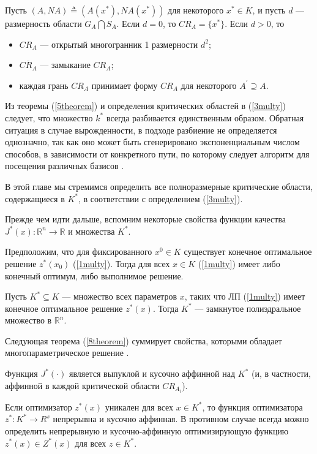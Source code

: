 \begin{theorem}\label{5theorem}
    Пусть $(A, NA) \triangleq (A (x^*), NA (x^*))$ для некоторого $x^* \in K$, и пусть $d$ --- размерность области $G_{A}\bigcap S_{A}$. Если $d = 0$, то $CR_{A} = \{x^*\}$. Если $d > 0$, то
    \begin{itemize}
        \item $CR_{A}$ --- открытый многогранник 1 размерности $d^2$;
        \item $\overline{CR_{A}}$ --- замыкание $CR_{A}$;
        \item каждая грань $CR_{A}$ принимает форму $CR_{A}$ для некоторого $A^{'} \supseteq A$.
    \end{itemize}
\end{theorem}

Из теоремы (\ref{5theorem}) и определения критических областей в (\ref{3multy}) следует, что множество $k^*$ всегда разбивается единственным образом. Обратная ситуация в случае вырожденности, в подходе \cite{Gal68} разбиение не определяется однозначно, так как оно может быть сгенерировано экспоненциальным числом способов, в зависимости от конкретного пути, по которому следует алгоритм для посещения различных базисов  \cite{Adler2,Berkelaar28}.

В этой главе мы стремимся определить все полноразмерные критические области, содержащиеся в $K^*$, в соответствии с определением (\ref{3multy}).

Прежде чем идти дальше, вспомним некоторые свойства функции качества $J^* (x): \mathbb{R}^{n} \to \mathbb{R}$ и множества $K^*$.


\begin{theorem}\label{6theorem}
    Предположим, что для фиксированного $x^0 \in K$ существует конечное оптимальное решение $z^* (x_0)$ (\ref{1multy}). Тогда для всех $x \in K$ (\ref{1multy}) имеет либо конечный оптимум, либо выполнимое решение.
\end{theorem}

\begin{theorem}\label{7theorem}
    Пусть $K^* \subseteq K$ --- множество всех параметров $x$, таких что ЛП (\ref{1multy}) имеет конечное оптимальное решение $z^* (x)$. Тогда $K^*$ --- замкнутое полиэдральное множество в $\mathbb{R}^{n}$.
\end{theorem}  

Следующая теорема (\ref{8theorem}) суммирует свойства, которыми обладает многопараметрическое решение \cite{Gal68}.
\begin{theorem}\label{8theorem}
    Функция $J^*(\cdot)$ является выпуклой и кусочно аффинной над $K^*$ (и, в частности, аффинной в каждой критической области $CR_{A_i}$).
    
    Если оптимизатор $z^* (x)$ уникален для всех $x \in K^*$, то функция оптимизатора $z^*: K^* \to R^{s}$ непрерывна и кусочно аффинная. В противном случае всегда можно определить непрерывную и кусочно-аффинную оптимизирующую функцию $z^* (x) \in Z^* (x)$ для всех $z \in K^*$.
\end{theorem}  


